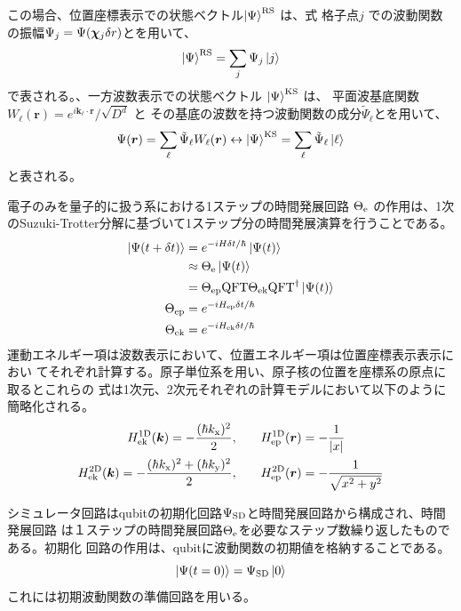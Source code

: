 \documentclass[fontsize=11pt]{jlreq}
\begin{document}
この場合、位置座標表示での状態ベクトル$\ket{\Psi}^{\mathrm{RS}}$ は、式
格子点$j$
での波動関数の振幅$\Psi_j=\Psi(\bm{\chi}_{j}\delta r)$とを用いて、
\begin{equation}
\ket{\Psi}^{\mathrm{RS}} = \sum_{j}\Psi_j\ket{j}
\end{equation}
で表される。、一方波数表示での状態ベクトル $\ket{\Psi}^{\mathrm{KS}}$ は、
平面波基底関数$W_{\ell}(\bm{r})=e^{i\bm{k}_{\ell}\cdot\bm{r}}/\sqrt{D^d}$ と
その基底の波数を持つ波動関数の成分$\tilde{\Psi}_{\ell}$とを用いて、
\begin{equation}
\Psi(\bm{r})=\sum_{\ell} \tilde{\Psi}_{\ell}W_{\ell}(\bm{r})\leftrightarrow
\ket{\Psi}^{\mathrm{KS}} = \sum_{\ell}\tilde{\Psi}_{\ell}\ket{\ell}
\end{equation}
と表される。

電子のみを量子的に扱う系における1ステップの時間発展回路 $\Theta_{\mathrm{e}}$ の作用は、1次
のSuzuki-Trotter分解に基づいて1ステップ分の時間発展演算を行うことである。
\begin{align}
\ket{\Psi(t+\delta t)}
 &= e^{-iH\delta t/\hbar}\ket{\Psi(t)} \notag \\
 &\approx \Theta_{\mathrm{e}} \ket{\Psi(t)} \label{eq:circuit-eval-theta-e}\\
 &= \Theta_{\mathrm{ep}}\mathrm{QFT}\Theta_{\mathrm{ek}}\mathrm{QFT}^\dagger\ket{\Psi(t)}\\
    \Theta_{\mathrm{ep}}&=e^{-iH_{\mathrm{ep}}\delta t/\hbar}\\
    \Theta_{\mathrm{ek}}&=e^{-iH_{\mathrm{ek}}\delta t/\hbar}
\end{align}
運動エネルギー項は波数表示において、位置エネルギー項は位置座標表示表示におい
てそれぞれ計算する。原子単位系を用い、原子核の位置を座標系の原点に取るとこれらの
式は1次元、2次元それぞれの計算モデルにおいて以下のように簡略化される。
\begin{align}
   H_{\mathrm{ek}}^{\mathrm{1D}}(\bm{k}) = -\frac{(\hbar k_{\mathrm{x}})^2}{2}, \qquad &
   H_{\mathrm{ep}}^{\mathrm{1D}}(\bm{r}) = -\frac{1}{{\left| x \right|}} \label{eq:HkHp1D}\\
   H_{\mathrm{ek}}^{\mathrm{2D}}(\bm{k}) = -\frac{(\hbar k_{\mathrm{x}})^2 + (\hbar k_{\mathrm{y}})^2}{2}, \qquad &
   H_{\mathrm{ep}}^{\mathrm{2D}}(\bm{r}) = -\frac{1}{\sqrt{x^2+y^2}} \label{eq:HkHp2D}
\end{align}

シミュレータ回路はqubitの初期化回路$\Psi_{\mathrm{SD}}$と時間発展回路から構成され、時間発展回路
は１ステップの時間発展回路$\Theta_{\mathrm{e}}$を必要なステップ数繰り返したものである。初期化
回路の作用は、qubitに波動関数の初期値を格納することである。
\begin{equation}
\ket{\Psi(t=0)} = \Psi_{\mathrm{SD}} \ket{0}
\end{equation}
これには初期波動関数の準備回路を用いる\cite[Sec. 2.2]{takahashi2024.doi:10.1021/acs.jctc.4c00708}。
\end{document}
